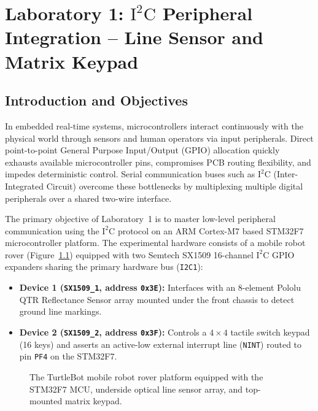 \chapter{Laboratory 1: \texorpdfstring{$\text{I}^2\text{C}$}{I2C} Peripheral Integration -- Line Sensor and Matrix Keypad}
\label{chap:lab1}

\section{Introduction and Objectives}
In embedded real-time systems, microcontrollers interact continuously with the physical world through sensors and human operators via input peripherals. Direct point-to-point General Purpose Input/Output (GPIO) allocation quickly exhausts available microcontroller pins, compromises PCB routing flexibility, and impedes deterministic control. Serial communication buses such as $\text{I}^2\text{C}$ (Inter-Integrated Circuit) overcome these bottlenecks by multiplexing multiple digital peripherals over a shared two-wire interface.

The primary objective of Laboratory~1 is to master low-level peripheral communication using the $\text{I}^2\text{C}$ protocol on an ARM Cortex-M7 based STM32F7 microcontroller platform. The experimental hardware consists of a mobile robot rover (Figure~\ref{fig:turtlebot_platform}) equipped with two Semtech SX1509 16-channel $\text{I}^2\text{C}$ GPIO expanders sharing the primary hardware bus (\texttt{I2C1}):
\begin{itemize}[noitemsep,topsep=2pt]
    \item \textbf{Device 1 (\texttt{SX1509\_1}, address \texttt{0x3E}):} Interfaces with an 8-element Pololu QTR Reflectance Sensor array mounted under the front chassis to detect ground line markings.
    \item \textbf{Device 2 (\texttt{SX1509\_2}, address \texttt{0x3F}):} Controls a $4 \times 4$ tactile switch keypad (16 keys) and asserts an active-low external interrupt line (\texttt{NINT}) routed to pin \texttt{PF4} on the STM32F7.
\end{itemize}

\begin{figure}[htbp]
    \centering
    \caption{The TurtleBot mobile robot rover platform equipped with the STM32F7 MCU, underside optical line sensor array, and top-mounted matrix keypad.}
    \label{fig:turtlebot_platform}
\end{figure}

